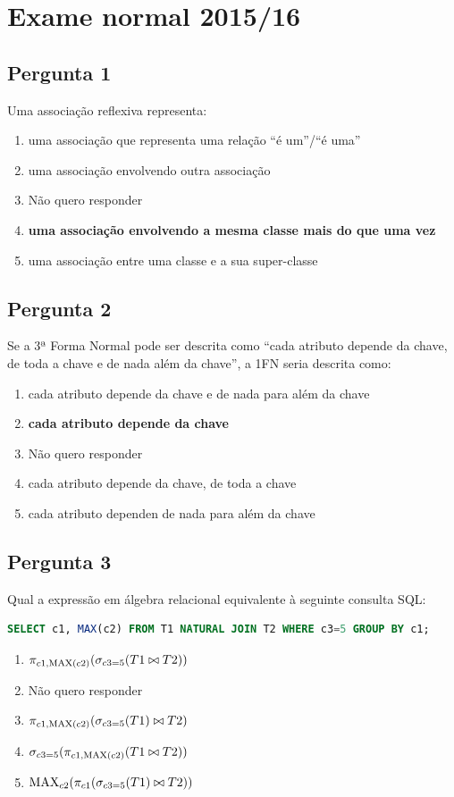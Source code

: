 \documentclass[type=normal, year=2015/16]{bdad_exam}
\begin{document}
{
\renewcommand{\thechapter}{\arabic{chapter}N}
\setcounter{chapter}{15}
\chapter{Exame normal 2015/16}
\section{Pergunta 1}
Uma associação reflexiva representa:
\begin{enumerate}[label=\alph*.]\itemsep0em
    \item uma associação que representa uma relação ``é um''/``é uma''
    \item uma associação envolvendo outra associação
    \item Não quero responder
    \item \textbf{uma associação envolvendo a mesma classe mais do que uma vez \greencheckmark}
    \item uma associação entre uma classe e a sua super-classe
\end{enumerate}

\section{Pergunta 2}
Se a 3ª Forma Normal pode ser descrita como ``cada atributo depende da chave, de toda a chave e de nada além da chave'', a 1FN seria descrita como:
\begin{enumerate}[label=\alph*.]\itemsep0em
    \item cada atributo depende da chave e de nada para além da chave
    \item \textbf{cada atributo depende da chave \greencheckmark}
    \item Não quero responder
    \item cada atributo depende da chave, de toda a chave
    \item cada atributo dependen de nada para além da chave
\end{enumerate}

\section{Pergunta 3}
Qual a expressão em álgebra relacional equivalente à seguinte consulta SQL:
\begin{lstlisting}[language=SQL]
SELECT c1, MAX(c2) FROM T1 NATURAL JOIN T2 WHERE c3=5 GROUP BY c1;
\end{lstlisting}
\begin{enumerate}[label=\alph*.]\itemsep0em
    \item $\pi_{c1, \text{MAX}(c2)}(\sigma_{c3=5}(T1 \bowtie T2))$ \greencheckmark
    \item Não quero responder
    \item $\pi_{c1,\text{MAX}(c2)}(\sigma_{c3=5}(T1) \bowtie T2)$
    \item $\sigma_{c3=5}(\pi_{c1,\text{MAX}(c2)}(T1 \bowtie T2))$
    \item $\text{MAX}_{c2}(\pi_{c1}(\sigma_{c3=5}(T1) \bowtie T2))$
\end{enumerate}

}
\end{document}
